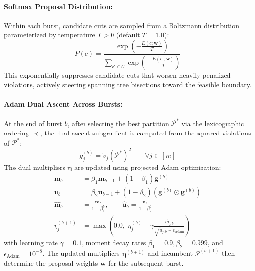 \documentclass{article}
\begin{document}

\paragraph{Softmax Proposal Distribution:} Within each burst, candidate cuts are sampled from a Boltzmann distribution parameterized by temperature $T > 0$ (default $T = 1.0$):
\begin{equation}
P(c) = \frac{\exp\left( - \frac{E(c; \mathbf{w})}{T} \right)}{\sum_{c' \in \mathcal{C}} \exp\left( - \frac{E(c'; \mathbf{w})}{T} \right)}
\end{equation}
This exponentially suppresses candidate cuts that worsen heavily penalized violations, actively steering spanning tree bisections toward the feasible boundary.

\paragraph{Adam Dual Ascent Across Bursts:} At the end of burst $b$, after selecting the best partition $\mathcal{P}^*$ via the lexicographic ordering $\prec$, the dual ascent subgradient is computed from the squared violations of $\mathcal{P}^*$:
\begin{equation}
g_j^{(b)} = \widetilde{v}_j(\mathcal{P}^*)^2 \qquad \forall j \in [m]
\end{equation}
The dual multipliers $\boldsymbol{\eta}$ are updated using projected Adam optimization: 
\begin{align}
\mathbf{m}_b &= \beta_1 \mathbf{m}_{b-1} + (1 - \beta_1) \mathbf{g}^{(b)} \\
\mathbf{u}_b &= \beta_2 \mathbf{u}_{b-1} + (1 - \beta_2) (\mathbf{g}^{(b)} \odot \mathbf{g}^{(b)}) \\
\widehat{\mathbf{m}}_b &= \frac{\mathbf{m}_b}{1 - \beta_1^b}, \qquad \widehat{\mathbf{u}}_b = \frac{\mathbf{u}_b}{1 - \beta_2^b} \\
\eta_j^{(b+1)} &= \max\left(0.0, \; \eta_j^{(b)} + \gamma \frac{\widehat{m}_{j, b}}{\sqrt{\widehat{u}_{j, b}} + \epsilon_{\text{Adam}}}\right)
\end{align}
with learning rate $\gamma = 0.1$, moment decay rates $\beta_1 = 0.9, \beta_2 = 0.999$, and $\epsilon_{\text{Adam}} = 10^{-8}$. The updated multipliers $\boldsymbol{\eta}^{(b+1)}$ and incumbent $\mathcal{P}^{(b+1)}$ then determine the proposal weights $\mathbf{w}$ for the subsequent burst. 
\end{document}
